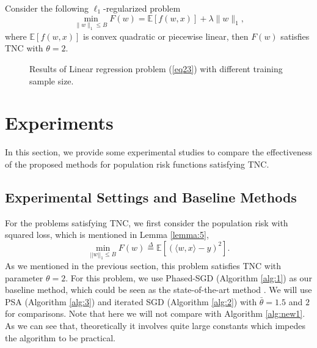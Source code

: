 \documentclass[12pt]{alt2022} %
\begin{document}
\begin{lemma}
    Consider the following $\ell_1$-regularized problem
    \begin{equation*}
        \min_{\|w\|_1\leq B}F(w)=\mathbb{E}[f(w, x)]+\lambda\|w\|_1,
    \end{equation*}
    where $\mathbb{E}[f(w, x)]$ is convex quadratic or piecewise linear, then $F(w)$ satisfies TNC with $\theta=2$. 
\end{lemma}
 \begin{figure*}[!htbp]
\centering
{}
\quad
{}
\quad
{}
\quad
{}
\caption{ Results of Linear regression problem (\ref{eq23}) with  different training sample size. }
\label{fig1}
\end{figure*}
\section{Experiments}\label{sec:experiments}
 In this section, we  provide some experimental studies to compare the effectiveness of the proposed methods for population risk functions satisfying TNC. 
  \subsection*{Experimental Settings and Baseline Methods}
 For the problems satisfying TNC, we first consider the population risk with squared loss, which is  mentioned in Lemma \ref{lemma:5}, 
  \begin{equation}\label{eq23}
 \min \limits_{||w||_1\leq B}F(w)\overset{\Delta}{=} \mathbb{E}[(\langle w, x\rangle -y)^2]. 
 \end{equation}
 As we mentioned in the previous section, this problem satisfies TNC with parameter $\theta=2$. For this problem, we use Phased-SGD (Algorithm \ref{alg:1}) as our baseline method, which could be seen as the state-of-the-art method \citep{feldman2020private}. We will use PSA (Algorithm \ref{alg:3}) and iterated SGD (Algorithm \ref{alg:2}) with $\bar{\theta}=1.5$ and $2$ for comparisons. Note that here we will not compare with Algorithm \ref{alg:new1}. As we can see that, theoretically it involves quite large constants which impedes the algorithm to be practical. 
 
\end{document}
